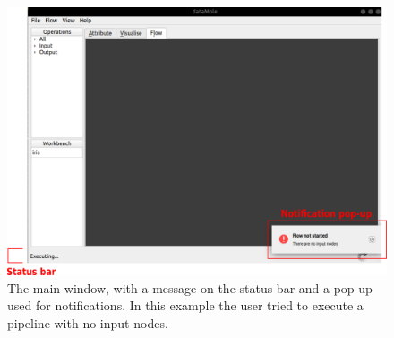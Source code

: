 \begin{figure}[p]
	\centering
	\includegraphics[width=\textwidth]{notification-example}
	\caption[The main window, with a message on the status bar and a pop-up used for notifications]{The main window, with a message on the status bar and a pop-up used for notifications. In this example the user tried to execute a pipeline with no input nodes.}
	\label{fig:notification-popup}
\end{figure}

\clearpage
